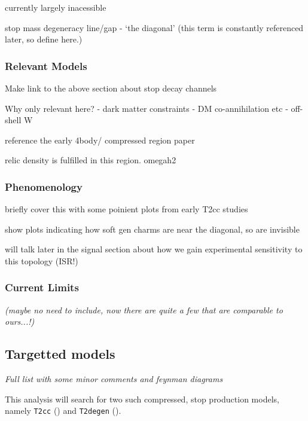 currently largely inacessible

stop mass degeneracy line/gap - `the diagonal' (this term is constantly
referenced later, so define here.)

\subsubsection{Relevant Models}
Make link to the above section about stop decay channels

Why only relevant here?
- dark matter constraints - DM co-annihilation etc
- off-shell W

reference the early 4body/ compressed region paper

relic density is fulfilled in this region. omegah2

\subsubsection{Phenomenology}
briefly cover this with some poinient plots from early T2cc studies

show plots indicating how soft gen charms are near the diagonal, so are
invisible

will talk later in the signal section about how we gain experimental sensitivity
to this topology (ISR!)

\subsubsection{Current Limits}
\emph{(maybe no need to include, now there are quite a few that are comparable
to
ours...!)}

\subsection{Targetted models}
\emph{Full list with some minor comments and feynman diagrams}

This analysis will search for two such compressed, stop production models,
namely \texttt{T2cc} (\Ttwocc) and \texttt{T2degen} (\Ttwodegen).